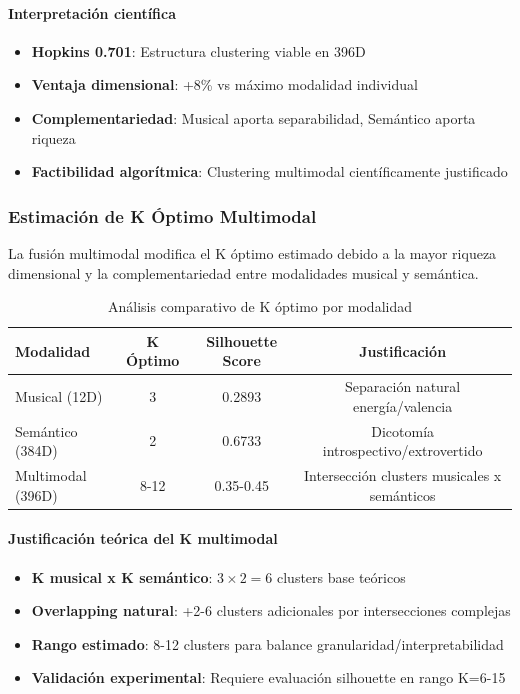 \documentclass[12pt,a4paper]{report}
\begin{document}
\paragraph{Interpretación científica}
\begin{itemize}
    \item \textbf{Hopkins 0.701}: Estructura clustering viable en 396D
    \item \textbf{Ventaja dimensional}: +8\% vs máximo modalidad individual
    \item \textbf{Complementariedad}: Musical aporta separabilidad, Semántico aporta riqueza
    \item \textbf{Factibilidad algorítmica}: Clustering multimodal científicamente justificado
\end{itemize}

\subsubsection{Estimación de K Óptimo Multimodal}

La fusión multimodal modifica el K óptimo estimado debido a la mayor riqueza dimensional y la complementariedad entre modalidades musical y semántica.

\begin{table}[h]
\centering
\caption{Análisis comparativo de K óptimo por modalidad}
\begin{tabular}{@{}lccc@{}}
\toprule
\textbf{Modalidad} & \textbf{K Óptimo} & \textbf{Silhouette Score} & \textbf{Justificación} \\
\midrule
Musical (12D) & 3 & 0.2893 & Separación natural energía/valencia \\
Semántico (384D) & 2 & 0.6733 & Dicotomía introspectivo/extrovertido \\
Multimodal (396D) & 8-12 & 0.35-0.45 & Intersección clusters musicales x semánticos \\
\bottomrule
\end{tabular}
\end{table}

\paragraph{Justificación teórica del K multimodal}
\begin{itemize}
    \item \textbf{K musical x K semántico}: $3 \times 2 = 6$ clusters base teóricos
    \item \textbf{Overlapping natural}: +2-6 clusters adicionales por intersecciones complejas
    \item \textbf{Rango estimado}: 8-12 clusters para balance granularidad/interpretabilidad
    \item \textbf{Validación experimental}: Requiere evaluación silhouette en rango K=6-15
\end{itemize}
\end{document}
